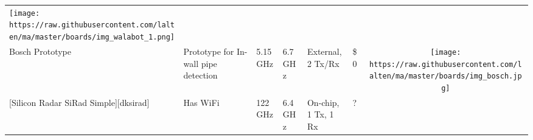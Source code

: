 \begin{longtable}[]{@{}llllllc@{}}
\begin{minipage}[t]{0.10\columnwidth}
\texttt{[image: https://raw.githubusercontent.com/lalten/ma/master/boards/img\_walabot\_1.png]}\strut
\end{minipage}\tabularnewline
\begin{minipage}[t]{0.09\columnwidth}\raggedright\strut
Bosch Prototype\strut
\end{minipage} & \begin{minipage}[t]{0.13\columnwidth}\raggedright\strut
Prototype for In-wall pipe detection\strut
\end{minipage} & \begin{minipage}[t]{0.09\columnwidth}\raggedright\strut
5.15GHz\strut
\end{minipage} & \begin{minipage}[t]{0.11\columnwidth}\raggedright\strut
6.7GHz\strut
\end{minipage} & \begin{minipage}[t]{0.10\columnwidth}\raggedright\strut
External, 2 Tx/Rx\strut
\end{minipage} & \begin{minipage}[t]{0.15\columnwidth}\raggedright\strut
\$0\strut
\end{minipage} & \begin{minipage}[t]{0.10\columnwidth}\centering\strut
\texttt{[image: https://raw.githubusercontent.com/lalten/ma/master/boards/img\_bosch.jpg]}\strut
\end{minipage}\tabularnewline
\begin{minipage}[t]{0.09\columnwidth}\raggedright\strut
{[}Silicon Radar SiRad Simple{]}{[}dksirad{]}\strut
\end{minipage} & \begin{minipage}[t]{0.13\columnwidth}\raggedright\strut
Has WiFi\strut
\end{minipage} & \begin{minipage}[t]{0.09\columnwidth}\raggedright\strut
122GHz\strut
\end{minipage} & \begin{minipage}[t]{0.11\columnwidth}\raggedright\strut
6.4GHz\strut
\end{minipage} & \begin{minipage}[t]{0.10\columnwidth}\raggedright\strut
On-chip, 1 Tx, 1 Rx\strut
\end{minipage} & \begin{minipage}[t]{0.15\columnwidth}\raggedright\strut
?\strut
\end{minipage} & \begin{minipage}[t]{0.10\columnwidth}\centering\strut

\end{minipage}
\end{longtable}
